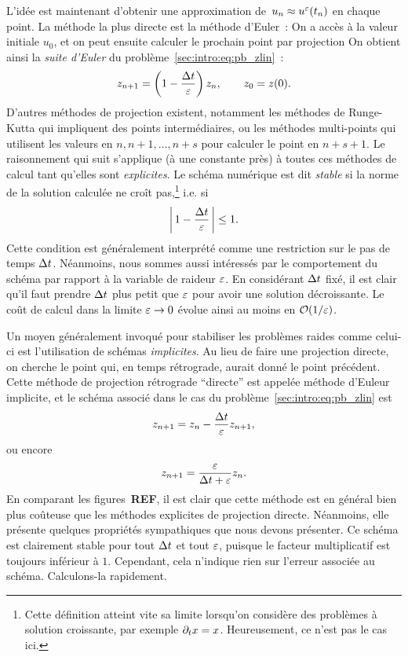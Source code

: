 L'idée est maintenant d'obtenir une approximation de~$u_n \approx
u^{\varepsilon}(t_n)$ en chaque point. La méthode la plus directe est la méthode
d'Euler~: On a accès à la valeur initiale $u_0$, et on peut ensuite
calculer le prochain point par projection 
%
%
\noindent%
On obtient ainsi la \textit{suite d'Euler} du
problème~\eqref{sec:intro:eq:pb_zlin}~:
\begin{equation*}
    z_{n+1} = \left( 1 - \frac{\Delta t}{\varepsilon} \right) z_n , 
    \qquad
    z_0 = z(0) .
\end{equation*}
D'autres méthodes de projection existent, notamment les méthodes de
Runge-Kutta qui impliquent des points intermédiaires, ou les méthodes
multi-points qui utilisent les valeurs en $n, n+1, \ldots, n+s$ pour
calculer le point en $n+s+1$. Le raisonnement qui suit s'applique (à une
constante près) à toutes ces méthodes de calcul tant qu'elles sont
\textit{explicites}. Le schéma numérique est dit \textit{stable} si la
norme de la solution calculée ne croît pas,\footnote{%
Cette définition atteint vite sa limite lorsqu'on considère des
problèmes à solution croissante, par exemple $\partial_t x = x$.
Heureusement, ce n'est pas le cas ici.} i.e. si 
\begin{equation*}
    \left|\, 1 - \frac{\Delta t}{\varepsilon} \,\right| \leq 1 .
\end{equation*}
Cette condition est généralement interprété comme une restriction sur le
pas de temps $\Delta t$. Néanmoins, nous sommes aussi intéressés par le
comportement du schéma par rapport à la variable de raideur $\varepsilon$. En
considérant $\Delta t$ fixé, il est clair qu'il faut prendre $\Delta t$ plus petit
que $\varepsilon$ pour avoir une solution décroissante. Le coût de calcul dans
la limite $\varepsilon \rightarrow 0$ évolue ainsi au moins en $\mathcal{O}(1/\varepsilon)$.

Un moyen généralement invoqué pour stabiliser les problèmes raides comme
celui-ci est l'utilisation de schémas \textit{implicites}. Au lieu de
faire une projection directe, on cherche le point qui, en temps
rétrograde, aurait donné le point précédent.
%
%
\noindent%
Cette méthode de projection rétrograde \enquote{directe} est appelée
méthode d'Euleur implicite, et le schéma associé dans le cas du
problème~\eqref{sec:intro:eq:pb_zlin} est 
\begin{equation*}
    z_{n+1} = z_n - \frac{\Delta t}{\varepsilon} z_{n+1} ,
\end{equation*}
ou encore 
\begin{equation*}
    z_{n+1} = \frac{\varepsilon}{\Delta t + \varepsilon} z_n .
\end{equation*}
En comparant les figures~\textbf{REF}, il est clair que
cette méthode est en général bien plus coûteuse que les méthodes
explicites de projection directe. Néanmoins, elle présente quelques
propriétés sympathiques que nous devons présenter. Ce schéma est
clairement stable pour tout $\Delta t$ et tout $\varepsilon$, puisque le facteur
multiplicatif est toujours inférieur à $1$. Cependant, cela n'indique
rien sur l'erreur associée au schéma. Calculons-la rapidement.

